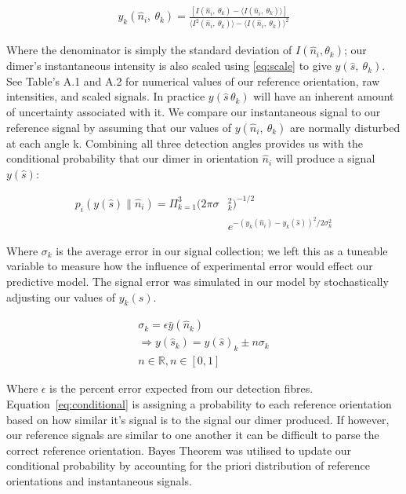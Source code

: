 \documentclass[final, 3p]{elsarticle}
\begin{document}
\begin{align}
	\label{eq:scale}
	y_k(\hat{n}_i,\ \theta_k) = 
	 \frac{\left[I(\hat{n}_i, \ \theta_k)- \langle I(\hat{n}_i, \ \theta_k) \rangle \right]} 
	{\langle I^2(\hat{n}_i,\ \theta_k) \rangle -\langle I(\hat{n}_i, \ \theta_k)\rangle^2}
\end{align}

Where the denominator is simply the standard deviation of $I(\hat{n}_i, \theta_k)$; our dimer's instantaneous intensity is also scaled using \eqref{eq:scale} to give $y(\hat{s},\ \theta_k)$. See Table's A.1 and A.2 for numerical values of our reference orientation, raw intensities, and scaled signals. In practice $y(\hat{s}\, \theta_k)$ will have an inherent amount of uncertainty associated with it. We compare our instantaneous signal to our reference signal by assuming that our values of $y(\hat{n}_i,\ \theta_k)$ are normally disturbed at each angle k. Combining all three detection angles provides us with the conditional probability that our dimer in orientation $\hat{n}_i$ will produce a signal $y(\hat{s})$: 

\begin{align}
	\label{eq:conditional}
	p_i(y(\hat{s})\parallel\hat{n}_i) = \Pi^3_{k=1}
	(2\pi\sigma&_k^2)^{-1/2}  \nonumber \\
	&e^{-(y_{k}(\hat{n}_i)-y_{k}(\hat{s}))^2/2\sigma_k^2}
\end{align}

Where $\sigma_k$ is the average error in our signal collection; we left this as a tuneable variable to measure how the influence of experimental error would effect our predictive model. The signal error was simulated in our model by stochastically adjusting our values of $y_k(\hat{s})$. 

\begin{eqnarray*}
	\sigma_k = \epsilon\bar{y}(\hat{n}_k) \\
	\Rightarrow y(\hat{s}_k) = y(\hat{s})_k \pm n\sigma_k \\ 
	n \in \mathbb{R}, n\in[0,1]
\end{eqnarray*} 

Where $\epsilon$ is the percent error expected from our detection fibres. Equation~\eqref{eq:conditional} is assigning a probability to each reference orientation based on how similar it's signal is to the signal our dimer produced. If however, our reference signals are similar to one another it can be difficult to parse the correct reference orientation. Bayes Theorem was utilised to update our conditional probability by accounting for the priori distribution of reference orientations and instantaneous signals. 
\end{document}
